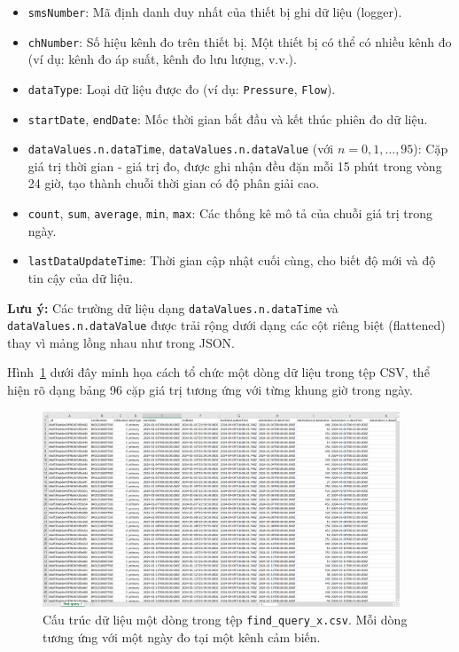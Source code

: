 \begin{itemize}
    \item \texttt{smsNumber}: Mã định danh duy nhất của thiết bị ghi dữ liệu (logger).
    \item \texttt{chNumber}: Số hiệu kênh đo trên thiết bị. Một thiết bị có thể có nhiều kênh đo (ví dụ: kênh đo áp suất, kênh đo lưu lượng, v.v.).
    \item \texttt{dataType}: Loại dữ liệu được đo (ví dụ: \texttt{Pressure}, \texttt{Flow}).
    \item \texttt{startDate}, \texttt{endDate}: Mốc thời gian bắt đầu và kết thúc phiên đo dữ liệu.
    \item \texttt{dataValues.n.dataTime}, \texttt{dataValues.n.dataValue} (với $n = 0,1,\ldots,95$): Cặp giá trị thời gian - giá trị đo, được ghi nhận đều đặn mỗi 15 phút trong vòng 24 giờ, tạo thành chuỗi thời gian có độ phân giải cao.
    \item \texttt{count}, \texttt{sum}, \texttt{average}, \texttt{min}, \texttt{max}: Các thống kê mô tả của chuỗi giá trị trong ngày.
    \item \texttt{lastDataUpdateTime}: Thời gian cập nhật cuối cùng, cho biết độ mới và độ tin cậy của dữ liệu.
\end{itemize}

\noindent
\textbf{Lưu ý:} Các trường dữ liệu dạng \texttt{dataValues.n.dataTime} và \texttt{dataValues.n.dataValue} được trải rộng dưới dạng các cột riêng biệt (flattened) thay vì mảng lồng nhau như trong JSON.

\vspace{1em}
Hình~\ref{fig:sample_data_structure} dưới đây minh họa cách tổ chức một dòng dữ liệu trong tệp CSV, thể hiện rõ dạng bảng 96 cặp giá trị tương ứng với từng khung giờ trong ngày.

\begin{figure}[H]
    \centering
    \includegraphics[width=0.95\textwidth]{image/section6_1/sample_data_structure.png}
    \caption{Cấu trúc dữ liệu một dòng trong tệp \texttt{find\_query\_x.csv}. Mỗi dòng tương ứng với một ngày đo tại một kênh cảm biến.}
    \label{fig:sample_data_structure}
\end{figure}

